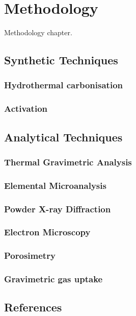 \chapter{Methodology}
\label{ch:methodology}

Methodology chapter.

\section{Synthetic Techniques}
\subsection{Hydrothermal carbonisation}
\subsection{Activation}

\section{Analytical Techniques}
\subsection{Thermal Gravimetric Analysis}
\subsection{Elemental Microanalysis}
\subsection{Powder X-ray Diffraction}
\subsection{Electron Microscopy}
\subsection{Porosimetry}
\subsection{Gravimetric gas uptake}

\section*{References}
